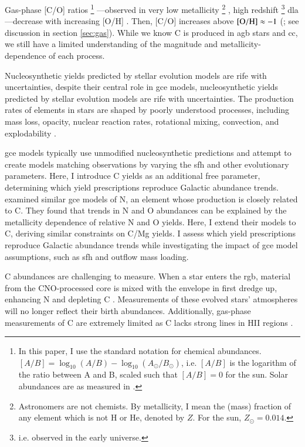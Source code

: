 \documentclass[12pt,oneside,letterpaper]{report}
\newcommand{\cc}{\gls{cc}}
\newcommand{\agb}{\gls{agb}}
\newcommand{\sfh}{\gls{sfh}}
\newcommand{\dla}{\gls{dla}}
\newcommand{\gce}{\gls{gce}}
\newcommand{\Gce}{\Gls{gce}}
\newcommand{\sun}{\odot}
\begin{document}
Gas-phase [C/O] ratios%
%
\footnote{In this paper, I use the standard notation for chemical abundances. $[A/B] = \log_{10}\left(A/B\right) - \log_{10}\left(A_{\sun}/B_{\sun}\right)$, i.e. $[A/B]$ is the logarithm of the ratio between A and B, scaled such that $[A/B]=0$ for the sun. Solar abundances are as measured in \citet{asplund+09}.}%
%
---observed in very low \gls{metallicity}
\footnote{Astronomers are not chemists. By metallicity, I mean the (mass) fraction of any element which is not H or He, denoted by $Z$. For the sun, $Z_\odot=0.014$. }
, high redshift
\footnote{i.e. observed in the early universe.}
\dla{}---decrease with increasing [O/H] \citep{FN15, cooke+17}. Then, [C/O] increases above $\rm [O/H] \approx -1$ (\citealt{berg+19}; see discussion in section \ref{sec:gas}).
While we know C is produced in \agb{} stars and \cc{}, we still have a limited understanding of the magnitude and metallicity-dependence of each process.


Nucleosynthetic yields predicted by stellar evolution models are rife with uncertainties, despite their central role in \gce{} models, nucleosynthetic yields predicted by stellar evolution models are rife with uncertainties. The production rates of elements in stars are shaped by poorly understood processes, including mass loss, opacity, nuclear reaction rates, rotational mixing, convection, and explodability \citep{KL14,ventura+13, LC18, emily+21}.

\Gce{} models typically use unmodified nucleosynthetic predictions and attempt to create models matching observations by varying the \sfh{} and other evolutionary parameters. Here, I introduce C yields as an additional free parameter, determining which yield prescriptions reproduce Galactic abundance trends.
\cite{james+23} examined similar \gce{} models of N, an element whose production is closely related to C. They  found that trends in N and O abundances can be explained by the \gls{metallicity} dependence of relative N and O yields. Here, I extend their models to C, deriving similar constraints on C/Mg yields. I assess which yield prescriptions reproduce Galactic abundance trends while investigating the impact of \gce{} model assumptions, such as \sfh{} and outflow mass loading.

C abundances are challenging to measure. When a star enters the \gls{rgb}, material from the CNO-processed core is mixed with the envelope in first dredge up, enhancing N and depleting C \citep{iben67, vincenzo+21,KL14}. Measurements of these evolved stars'  atmospheres will no longer reflect their birth abundances.  Additionally, gas-phase measurements of C are extremely limited as C lacks strong lines in HII regions \citep{skillman+20}.
\end{document}
